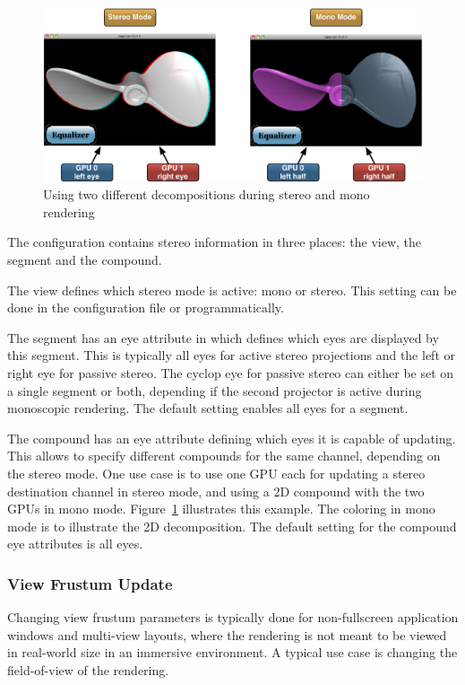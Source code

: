 \documentclass[10pt,a4]{scrartcl}
\newcommand{\fig}[1]{Figure~\ref{#1}}
\begin{document}
\begin{figure}
  \includegraphics[width=.618\textwidth]{images/stereoSwitch.pdf}
  {\caption{\label{fStereoSwitch}Using two different decompositions during
      stereo and mono rendering}}
\end{figure}
The configuration contains stereo information in three places: the view, the
segment and the compound.

The view defines which stereo mode is active: mono or stereo. This setting can
be done in the configuration file or programmatically.

The segment has an \textsf{eye} attribute in which defines which eyes are
displayed by this segment. This is typically all eyes for active stereo
projections and the left or right eye for passive stereo. The cyclop eye for
passive stereo can either be set on a single segment or both, depending if the
second projector is active during monoscopic rendering. The default setting
enables all eyes for a segment.

The compound has an \textsf{eye} attribute defining which eyes it is capable of
updating. This allows to specify different compounds for the same channel,
depending on the stereo mode. One use case is to use one GPU each for updating a
stereo destination channel in stereo mode, and using a 2D compound with the two
GPUs in mono mode. \fig{fStereoSwitch} illustrates this example. The coloring in
mono mode is to illustrate the 2D decomposition. The default setting for the
compound eye attributes is all eyes.

\subsubsection{View Frustum Update}

Changing view frustum parameters is typically done for non-fullscreen
application windows and multi-view layouts, where the rendering is not
meant to be viewed in real-world size in an immersive environment. A
typical use case is changing the field-of-view of the rendering.
\end{document}
